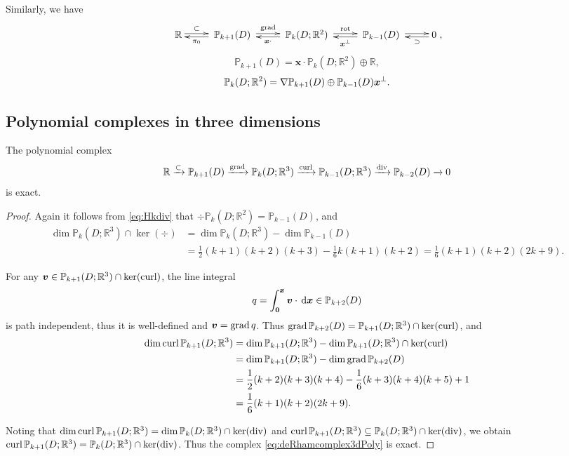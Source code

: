 Similarly, we have
\begin{equation*}
\xymatrix{
\mathbb R\ar@<0.4ex>[r]^-{\subset} & \; \mathbb P_{k+1}(D)\; \ar@<0.4ex>[r]^-{\grad}\ar@<0.4ex>[l]^-{\pi_0}  & \; \mathbb P_k(D;\mathbb R^2) \ar@<0.4ex>[r]^-{\rot}\; \ar@<0.4ex>[l]^-{\boldsymbol x\cdot} & \; \mathbb P_{k-1}(D)  \; \ar@<0.4ex>[r]^-{} \ar@<0.4ex>[l]^-{\boldsymbol x^{\bot}}
& 0 \ar@<0.4ex>[l]^-{\supset} },
\end{equation*}
\[
\mathbb P_{k+1}(D) = \boldsymbol x\cdot\mathbb P_k(D;\mathbb R^2)\oplus\mathbb R,
\]
\[
\mathbb P_{k}(D;\mathbb R^2)=\nabla\mathbb P_{k+1}(D)\oplus\mathbb P_{k-1}(D)\boldsymbol x^{\perp}.
\]


\subsection{Polynomial complexes in three dimensions}


\begin{lemma}
The polynomial complex
\begin{equation}\label{eq:deRhamcomplex3dPoly}
\mathbb R\xrightarrow{\subset} \mathbb P_{k+1}(D)\xrightarrow{\operatorname{grad}} \mathbb P_{k}(D;\mathbb R^3)\xrightarrow{\operatorname{curl}}\mathbb P_{k-1}(D;\mathbb R^3) \xrightarrow{\operatorname{div}} \mathbb P_{k-2}(D)\xrightarrow{}0
\end{equation}
is exact.
\end{lemma}
\begin{proof}
Again it follows from \eqref{eq:Hkdiv} that $\div\mathbb P_k(D;\mathbb R^2) = \mathbb P_{k-1}(D)$, and
\begin{align*}
\dim\mathbb P_k(D;\mathbb R^3)\cap\ker(\div)&=\dim \mathbb P_k(D; \mathbb R^3)-\dim \mathbb P_{k-1}(D) \\
&=\frac{1}{2}(k+1)(k+2)(k+3)-\frac{1}{6}k(k+1)(k+2)=\frac{1}{6}(k+1)(k+2)(2k+9).
\end{align*}

For any $\boldsymbol v\in\mathbb P_{k+1}(D; \mathbb R^3)\cap\ker(\operatorname{curl})$, the line integral
\[
q=\int_{\boldsymbol 0}^{\boldsymbol x}\boldsymbol v\cdot\,{\rm d}\boldsymbol x \in \mathbb P_{k+2}(D)
\]
is path independent, thus it is well-defined and $\boldsymbol v=\operatorname{grad} q$. Thus $\operatorname{grad}\mathbb P_{k+2}(D)=\mathbb P_{k+1}(D; \mathbb R^3)\cap\ker(\operatorname{curl})$, and
\begin{align*}
\dim\operatorname{curl}\mathbb P_{k+1}(D; \mathbb R^3)&=\dim \mathbb P_{k+1}(D; \mathbb R^3)-\dim \mathbb P_{k+1}(D; \mathbb R^3)\cap\ker(\operatorname{curl}) \\
&=\dim \mathbb P_{k+1}(D; \mathbb R^3)-\dim\operatorname{grad}\mathbb P_{k+2}(D) \\
&=\frac{1}{2}(k+2)(k+3)(k+4)-\frac{1}{6}(k+3)(k+4)(k+5)+1 \\
&=\frac{1}{6}(k+1)(k+2)(2k+9).
\end{align*}

Noting that $\dim\operatorname{curl}\mathbb P_{k+1}(D; \mathbb R^3)=\dim\mathbb P_k(D;\mathbb R^3)\cap\ker(\operatorname{div})$ and $\operatorname{curl}\mathbb P_{k+1}(D; \mathbb R^3)\subseteq\mathbb P_k(D;\mathbb R^3)\cap\ker(\operatorname{div})$, we obtain $\operatorname{curl}\mathbb P_{k+1}(D; \mathbb R^3)=\mathbb P_k(D;\mathbb R^3)\cap\ker(\operatorname{div})$.
Thus the complex \eqref{eq:deRhamcomplex3dPoly} is exact.
\end{proof}

